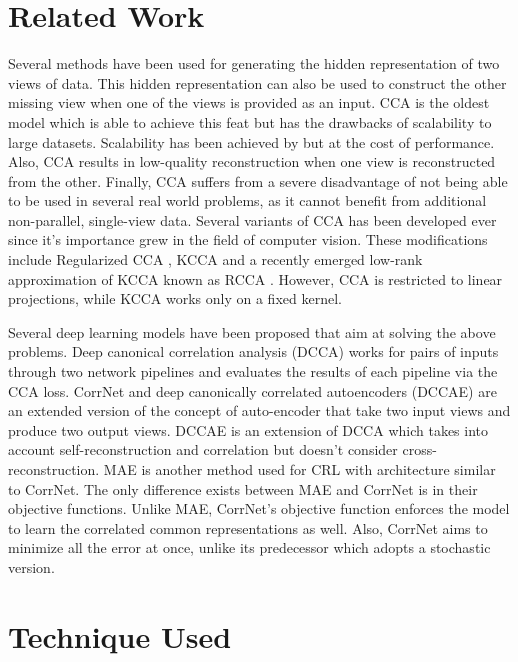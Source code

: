 \documentclass[10pt, a4paper, conference, compsocconf]{IEEEtran}
\begin{document}
\section{Related Work}
\label{sec_rel}
Several methods have been used for generating the hidden representation of two views of data. This hidden representation can also be used to construct the other missing view when one of the views is provided as an input. CCA \cite{hardle2007canonical,thompson2005canonical} is the oldest model which is able to achieve this feat but has the drawbacks of scalability to large datasets. Scalability has been achieved by \cite{lu2014scalable_cca} but at the cost of performance. Also, CCA results in low-quality reconstruction when one view is reconstructed from the other. Finally, CCA suffers from a severe disadvantage of not being able to be used in several real world problems, as it cannot benefit from additional non-parallel, single-view data. Several variants of CCA has been developed ever since it's importance grew in the field of computer vision. These modifications include Regularized CCA \cite{mineiro2014rcca}, KCCA \cite{akaho2006kcca,yu2014kcca} and a recently emerged low-rank approximation of KCCA known as RCCA \cite{mineiro2014rcca}. However, CCA is restricted to linear projections, while KCCA works only on a fixed kernel. 

Several deep learning models have been proposed that aim at solving the above problems. Deep canonical correlation analysis (DCCA) \cite{andrew2013dcca} works for pairs of inputs through two network pipelines and evaluates the results of each pipeline via the CCA loss.
CorrNet \cite{chandar2016correlational} and deep canonically correlated autoencoders (DCCAE) \cite{wang2015deepcca} are an extended version of the concept of auto-encoder that take two input views and produce two output views. DCCAE is an extension of DCCA which takes into account self-reconstruction and correlation but doesn't consider cross-reconstruction. MAE \cite{ngiam2011multimodal} is another method used for CRL with architecture similar to CorrNet. The only difference exists between MAE and CorrNet is in their objective functions. Unlike MAE, CorrNet's objective function enforces the model to learn the correlated common representations as well. Also, CorrNet aims to minimize all the error at once, unlike its predecessor which adopts a stochastic version. 


\section{Technique Used}
\label{sec_tech}
\end{document}
